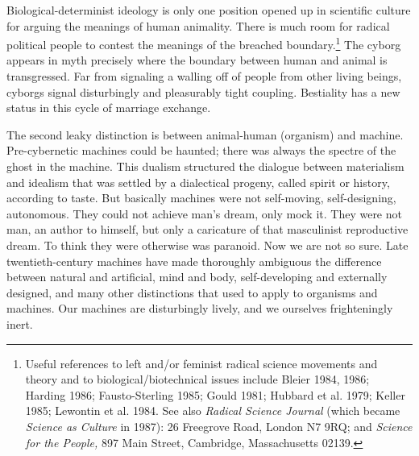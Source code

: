 \documentclass[DIV=12,%
               BCOR=10mm,%
               headinclude=false,%
               footinclude=false,open=any,%
               fontsize=11pt,%
               twoside,%
               paper=210mm:11in]%
               {scrbook}
\newcommand*{\Slash}{\slash\hspace{0pt}}
\begin{document}
Biological-determinist ideology is only one position opened up in scientific culture for arguing the meanings of human animality. There is much room for radical political people to contest the meanings of the breached boundary.\footnote{Useful references to left and\Slash{}or feminist radical science movements and theory and to biological\Slash{}biotechnical issues include Bleier 1984, 1986; Harding 1986; Fausto-Sterling 1985; Gould 1981; Hubbard et al. 1979; Keller 1985; Lewontin et al. 1984. See also \emph{Radical Science Journal} (which became \emph{Science as Culture} in 1987): 26 Freegrove Road, London N7 9RQ; and \emph{Science for the People,} 897 Main Street, Cambridge, Massachusetts 02139.} The cyborg appears in myth precisely where the boundary between human and animal is transgressed. Far from signaling a walling off of people from other living beings, cyborgs signal disturbingly and pleasurably tight coupling. Bestiality has a new status in this cycle of marriage exchange.


The second leaky distinction is between animal-human (organism) and machine. Pre-cybernetic machines could be haunted; there was always the spectre of the ghost in the machine. This dualism structured the dialogue between materialism and idealism that was settled by a dialectical progeny, called spirit or history, according to taste. But basically machines were not self-moving, self-designing, autonomous. They could not achieve man’s dream, only mock it. They were not man, an author to himself, but only a caricature of that masculinist reproductive dream. To think they were otherwise was paranoid. Now we are not so sure. Late twentieth-century machines have made thoroughly ambiguous the difference between natural and artificial, mind and body, self-developing and externally designed, and many other distinctions that used to apply to organisms and machines. Our machines are disturbingly lively, and we ourselves frighteningly inert.
\end{document}
